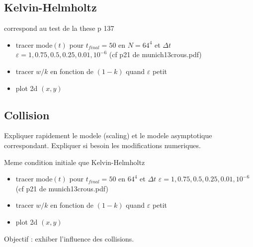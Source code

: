 \documentclass[12pt, a4paper]{article}
\begin{document}
\subsection{Kelvin-Helmholtz}
correspond au test  de la these p 137
\begin{itemize}
\item tracer mode$(t)$ pour $t_{final}=50$ en  $N=64^4$ et $\Delta t$ 
$\varepsilon=1, 0.75, 0.5, 0.25, 0.01, 10^{-6}$ (cf p21 de munich13crous.pdf)
\item tracer $w/k$ en fonction de $(1-k)$ quand $\varepsilon$ petit 
\item plot 2d $(x,y)$
\end{itemize}

\subsection{Collision}
Expliquer rapidement le modele (scaling) et le modele asymptotique correspondant. 
Expliquer si besoin les modifications numeriques.  

Meme condition initiale que Kelvin-Helmholtz
\begin{itemize}
\item tracer mode$(t)$ pour $t_{final}=50$ en  $64^4$ et $\Delta t$ 
$\varepsilon=1, 0.75, 0.5, 0.25, 0.01, 10^{-6}$ (cf p21 de munich13crous.pdf)
\item tracer $w/k$ en fonction de $(1-k)$ quand $\varepsilon$ petit 
\item plot 2d $(x,y)$
\end{itemize}
Objectif : exhiber l'influence des collisions. 


\appendix
\end{document}
